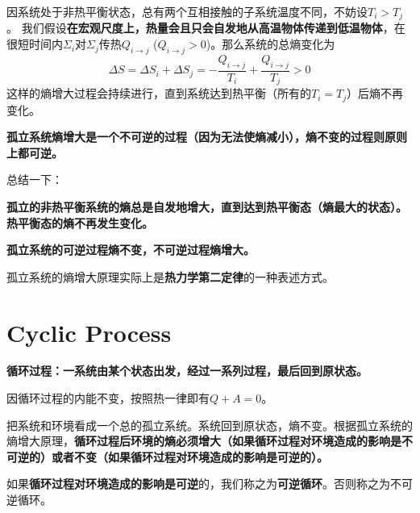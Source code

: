 \documentclass[CJK]{beamer}
\begin{document}
\begin{frame}
\bch
因系统处于非热平衡状态，总有两个互相接触的子系统温度不同，不妨设$T_i>T_j$。
我们假设{\bf 在宏观尺度上，热量会且只会自发地从高温物体传递到低温物体}，在很短时间内$\Sigma_i$对$\Sigma_j$传热$Q_{i\rightarrow j}$ ($Q_{i\rightarrow j}>0$)。那么系统的总熵变化为
$$\Delta S = \Delta S_i + \Delta S_j = - \frac{Q_{i\rightarrow j}}{T_i}+ \frac{Q_{i\rightarrow j}}{T_j}  > 0$$
这样的熵增大过程会持续进行，直到系统达到热平衡（所有的$T_i = T_j$）后熵不再变化。

{\bf 孤立系统熵增大是一个不可逆的过程（因为无法使熵减小），熵不变的过程则原则上都可逆。}

\ech
\end{frame}

\begin{frame}
\bch
总结一下：

\bitem
\item{\bf 孤立的非热平衡系统的熵总是自发地增大，直到达到热平衡态（熵最大的状态）。热平衡态的熵不再发生变化。}
\item{\bf 孤立系统的可逆过程熵不变，不可逆过程熵增大。}
\eitem

孤立系统的熵增大原理实际上是{\bf 热力学第二定律}的一种表述方式。

\ech
\end{frame}


\section{Cyclic Process}

\begin{frame}
\bch
{}
\ech
\end{frame}

\begin{frame}
\bch
{\bf 循环过程：一系统由某个状态出发，经过一系列过程，最后回到原状态。}

\skiplines
\bitem
\item{因循环过程的内能不变，按照热一律即有$Q+A = 0$。}
\item{把系统和环境看成一个总的孤立系统。系统回到原状态，熵不变。根据孤立系统的熵增大原理，{\bf 循环过程后环境的熵必须增大（如果循环过程对环境造成的影响是不可逆的）或者不变（如果循环过程对环境造成的影响是可逆的）。}}
\eitem

如果{\bf 循环过程对环境造成的影响是可逆}的，我们称之为{\bf 可逆循环}。否则称之为不可逆循环。

\ech
\end{frame}
\end{document}
